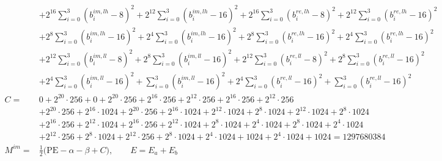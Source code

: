 \documentclass[fleqn]{article}
\begin{document}
{\[{\begin{aligned}
  & + 2^{16}\!\sum_{i=0}^{3}(b_i^{im,lh}{-}8)^2 + 2^{12}\!\sum_{i=0}^{3}(b_i^{im,lh}{-}16)^2 + 2^{16}\!\sum_{i=0}^{3}(b_i^{re,lh}{-}8)^2 + 2^{12}\!\sum_{i=0}^{3}(b_i^{re,lh}{-}16)^2 \\
  & + 2^{8}\!\sum_{i=0}^{3}(b_i^{im,lh}{-}16)^2 + 2^{4}\!\sum_{i=0}^{3}(b_i^{im,lh}{-}16)^2 + 2^{8}\!\sum_{i=0}^{3}(b_i^{re,lh}{-}16)^2 + 2^{4}\!\sum_{i=0}^{3}(b_i^{re,lh}{-}16)^2 \\
  & + 2^{12}\!\sum_{i=0}^{3}(b_i^{im,ll}{-}8)^2 + 2^{8}\!\sum_{i=0}^{3}(b_i^{im,ll}{-}16)^2 + 2^{12}\!\sum_{i=0}^{3}(b_i^{re,ll}{-}8)^2 + 2^{8}\!\sum_{i=0}^{3}(b_i^{re,ll}{-}16)^2 \\
  & + 2^{4}\!\sum_{i=0}^{3}(b_i^{im,ll}{-}16)^2 + \sum_{i=0}^{3}(b_i^{im,ll}{-}16)^2 + 2^{4}\!\sum_{i=0}^{3}(b_i^{re,ll}{-}16)^2 + \sum_{i=0}^{3}(b_i^{re,ll}{-}16)^2 \\[0.35em]
C ={}& 0 + 2^{20}\!\cdot\!256 + 0 + 2^{20}\!\cdot\!256 + 2^{16}\!\cdot\!256 + 2^{12}\!\cdot\!256 + 2^{16}\!\cdot\!256 + 2^{12}\!\cdot\!256 \\
  & + 2^{20}\!\cdot\!256 + 2^{16}\!\cdot\!1024 + 2^{20}\!\cdot\!256 + 2^{16}\!\cdot\!1024 + 2^{12}\!\cdot\!1024 + 2^{8}\!\cdot\!1024 + 2^{12}\!\cdot\!1024 + 2^{8}\!\cdot\!1024 \\
  & + 2^{16}\!\cdot\!256 + 2^{12}\!\cdot\!1024 + 2^{16}\!\cdot\!256 + 2^{12}\!\cdot\!1024 + 2^{8}\!\cdot\!1024 + 2^{4}\!\cdot\!1024 + 2^{8}\!\cdot\!1024 + 2^{4}\!\cdot\!1024 \\
  & + 2^{12}\!\cdot\!256 + 2^{8}\!\cdot\!1024 + 2^{12}\!\cdot\!256 + 2^{8}\!\cdot\!1024 + 2^{4}\!\cdot\!1024 + 1024 + 2^{4}\!\cdot\!1024 + 1024 = 1297680384 \\[0.3em]
M^{im} ={}& \tfrac12\big(\mathrm{PE} - \alpha - \beta + C\big), \qquad E = E_a + E_b
\end{aligned}
\;}
\]
}
\end{document}
